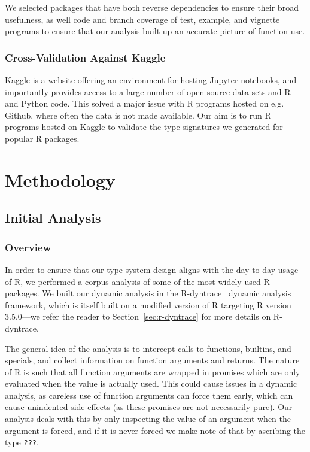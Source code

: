 \documentclass[acmsmall,review,anonymous]{acmart}\settopmatter{printfolios=true,printccs=false,printacmref=false}
\begin{document}
We selected packages that have both  reverse dependencies to ensure their broad usefulness, as well  code and branch coverage of test, example, and vignette programs to ensure that our analysis built up an accurate picture of function use.

%
%
\subsubsection{Cross-Validation Against Kaggle}

Kaggle is a website offering an environment for hosting Jupyter notebooks, and importantly provides access to a large number of open-source data sets and R and Python code.
This solved a major issue with R programs hosted on e.g. Github, where often the data is not made available.
Our aim is to run R programs hosted on Kaggle to validate the type signatures we generated for popular R packages.


%
%
%
%
%
%
\section{Methodology}

%
%
%
%
\subsection{Initial Analysis}

%
%
\subsubsection{Overview}

In order to ensure that our type system design aligns with the day-to-day usage of R, we performed a corpus analysis of some of the most widely used R packages.
We built our dynamic analysis in the R-dyntrace~\cite{oopsla19} dynamic analysis framework, which is itself built on a modified version of R targeting R version 3.5.0---we refer the reader to Section~\ref{sec:r-dyntrace} for more details on R-dyntrace.

The general idea of the analysis is to intercept calls to functions, builtins, and specials, and collect information on function arguments and returns.
The nature of R is such that all function arguments are wrapped in promises which are only evaluated when the value is actually used.
This could cause issues in a dynamic analysis, as careless use of function arguments can force them early, which can cause unindented side-effects (as these promises are not necessarily pure).
Our analysis deals with this by only inspecting the value of an argument when the argument is forced, and if it is never forced we make note of that by ascribing the type {\tt ???}.
\end{document}

